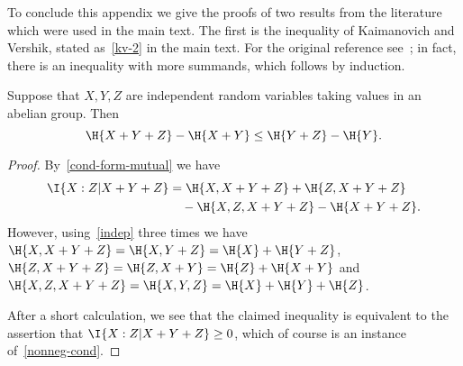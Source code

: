 To conclude this appendix we give the proofs of two results from the literature which were used in the main text. The first is the inequality of Kaimanovich and Vershik, stated as~\eqref{kv-2} in the main text. For the original reference see~\cite[Proposition 1.3]{kv}; in fact, there is an inequality with more summands, which follows by induction.

\begin{lemma}
Suppose that $X, Y, Z$ are independent random variables taking values in an abelian group. Then
\[
  \H{X + Y + Z} - \H{X + Y} \leq \H{Y+Z} - \H{Y}.
\]
\end{lemma}
\begin{proof}
By~\eqref{cond-form-mutual} we have
\begin{align*}
\I{ X : Z | X+Y+Z} &= \H{X, X+Y+Z} + \H{Z, X+Y+Z} \\
&\quad - \H{X, Z, X+Y+Z} - \H{X+Y+Z}.
\end{align*}
However, using~\eqref{indep} three times we have $\H{X, X+Y+Z} = \H{X, Y+Z} = \H{X} + \H{Y+Z}$, $\H{Z, X+Y + Z} = \H{Z, X+Y} = \H{Z} + \H{X+Y}$ and $\H{X, Z, X+Y+Z} = \H{X, Y, Z} = \H{X} + \H{Y} + \H{Z}$.

After a short calculation, we see that the claimed inequality is equivalent to the assertion that $\I{ X : Z | X+Y+Z} \geq 0$, which of course is an instance of~\eqref{nonneg-cond}.
\end{proof}



